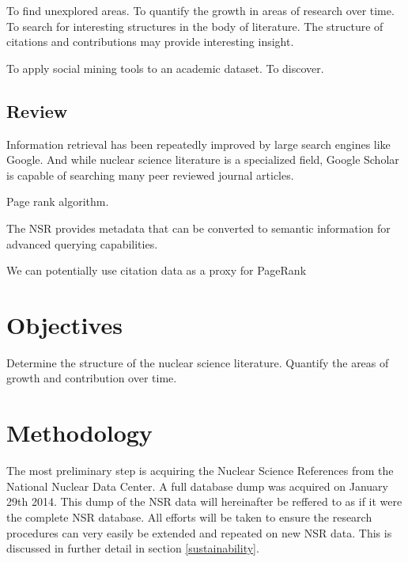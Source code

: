 \documentclass[12pt]{article}
\begin{document}
\begin{doublespacing}
To find unexplored areas.
To quantify the growth in areas of research over time.
To search for interesting structures in the body of literature. The structure of citations and contributions may provide interesting insight.

To apply social mining tools to an academic dataset.
To discover.


\subsection{Review}
Information retrieval has been repeatedly improved by large search engines like Google.
And while nuclear science literature is a specialized field, Google Scholar is capable of searching many peer reviewed journal articles.

Page rank algorithm.

The NSR provides metadata that can be converted to semantic information for advanced querying capabilities.

We can potentially use citation data as a proxy for PageRank



\pagebreak
\section{Objectives}
Determine the structure of the nuclear science literature.
Quantify the areas of growth and contribution over time.

\pagebreak
\section{Methodology}


The most preliminary step is acquiring the Nuclear Science References from the National Nuclear Data Center.
A full database dump was acquired on January 29th 2014.
This dump of the NSR data will hereinafter be reffered to as if it were the complete NSR database.
All efforts will be taken to ensure the research procedures can very easily be extended and repeated on new NSR data.
This is discussed in further detail in section \ref{sustainability}.


\end{doublespacing}
\end{document}
